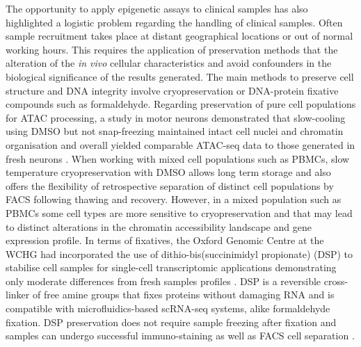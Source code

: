 The opportunity to apply epigenetic assays to clinical samples has also highlighted a logistic problem regarding the handling of clinical samples. Often sample recruitment takes place at distant geographical locations or out of normal working hours. This requires the application of preservation methods that  the alteration of the \textit{in vivo} cellular characteristics and avoid confounders in the biological significance of the results generated. The main methods to preserve cell structure and DNA integrity involve cryopreservation or DNA-protein fixative compounds such as formaldehyde. Regarding preservation of pure cell populations for ATAC processing, a study in motor neurons demonstrated that slow-cooling using DMSO but not snap-freezing maintained intact cell nuclei and chromatin organisation and overall yielded comparable ATAC-seq data to those generated in fresh neurons \parencite{Milani2016}. When working with mixed cell populations such as PBMCs, slow temperature cryopreservation with DMSO allows long term storage and also offers the flexibility of retrospective separation of distinct cell populations by FACS following thawing and recovery. However, in a mixed population such as PBMCs some cell types are more sensitive to cryopreservation and that may lead to distinct alterations in the chromatin accessibility landscape and gene expression profile. In terms of fixatives, the Oxford Genomic Centre at the WCHG had incorporated the use of dithio-bis(succinimidyl propionate) (DSP) to stabilise cell samples for single-cell transcriptomic applications demonstrating only moderate differences from fresh samples profiles \parencite{Attar2018}. DSP is a reversible cross-linker of free amine groups that fixes proteins without damaging RNA and is compatible with microfluidics-based scRNA-seq systems, alike formaldehyde fixation. DSP preservation does not require sample freezing after fixation and samples can undergo successful immuno-staining as well as FACS cell separation \parencite{Espina2013}. %



